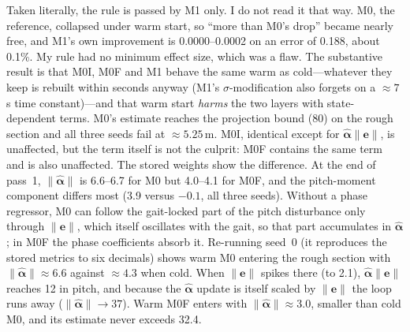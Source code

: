 \documentclass[conference]{IEEEtran}
\begin{document}
Taken literally, the rule is passed by M1 only. I do not read it that
way. M0, the reference, collapsed under warm start, so ``more than M0's
drop'' became nearly free, and M1's own improvement is 0.0000--0.0002 on
an error of 0.188, about 0.1\%. My rule had no minimum effect size, which
was a flaw. The substantive result is that M0I, M0F and M1 behave the
same warm as cold---whatever they keep is rebuilt within seconds anyway
(M1's $\sigma$-modification also forgets on a ${\approx}7$\,s time
constant)---and that warm start \emph{harms} the two layers with
state-dependent terms. M0's estimate reaches the projection bound (80) on
the rough section and all three seeds fail at ${\approx}5.25$\,m. M0I,
identical except for $\hat{\bm\alpha}\|\bm e\|$, is unaffected, but the
term itself is not the culprit: M0F contains the same term and is also
unaffected. The stored weights show the difference. At the end of
pass~1, $\|\hat{\bm\alpha}\|$ is 6.6--6.7 for M0 but 4.0--4.1 for M0F,
and the pitch-moment component differs most (3.9 versus $-0.1$, all
three seeds). Without a phase regressor, M0 can follow the gait-locked
part of the pitch disturbance only through $\|\bm e\|$, which itself
oscillates with the gait, so that part accumulates in
$\hat{\bm\alpha}$; in M0F the phase coefficients absorb it. Re-running
seed~0 (it reproduces the stored metrics to six decimals) shows warm M0
entering the rough section with $\|\hat{\bm\alpha}\|\approx6.6$ against
$\approx4.3$ when cold. When $\|\bm e\|$ spikes there (to 2.1),
$\hat{\bm\alpha}\|\bm e\|$ reaches 12 in pitch, and because the
$\hat{\bm\alpha}$ update is itself scaled by $\|\bm e\|$ the loop runs
away ($\|\hat{\bm\alpha}\|\to37$). Warm M0F enters with
$\|\hat{\bm\alpha}\|\approx3.0$, smaller than cold M0, and its estimate
never exceeds 32.4.
\end{document}
